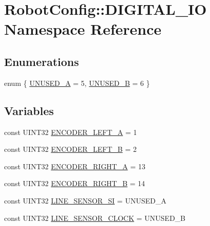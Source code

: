 \hypertarget{namespace_robot_config_1_1_d_i_g_i_t_a_l___i_o}{
\section{\-Robot\-Config\-:\-:\-D\-I\-G\-I\-T\-A\-L\-\_\-\-I\-O \-Namespace \-Reference}
\label{namespace_robot_config_1_1_d_i_g_i_t_a_l___i_o}
}
\subsection*{\-Enumerations}
\begin{DoxyCompactItemize}
\item 
enum \{ \hyperlink{namespace_robot_config_1_1_d_i_g_i_t_a_l___i_o_a8b8a1ff8bec1c8045cba1a03dfa5eca2a066884c8c940fd49bb5b067e65a282fb}{\-U\-N\-U\-S\-E\-D\-\_\-\-A} =  5, 
\hyperlink{namespace_robot_config_1_1_d_i_g_i_t_a_l___i_o_a8b8a1ff8bec1c8045cba1a03dfa5eca2ada8313080195b88178515eb12a62b789}{\-U\-N\-U\-S\-E\-D\-\_\-\-B} =  6
 \}
\end{DoxyCompactItemize}
\subsection*{\-Variables}
\begin{DoxyCompactItemize}
\item 
const \-U\-I\-N\-T32 \hyperlink{namespace_robot_config_1_1_d_i_g_i_t_a_l___i_o_a47224f03604ec5254954ee2da426eb73}{\-E\-N\-C\-O\-D\-E\-R\-\_\-\-L\-E\-F\-T\-\_\-\-A} = 1
\item 
const \-U\-I\-N\-T32 \hyperlink{namespace_robot_config_1_1_d_i_g_i_t_a_l___i_o_a50ba694d1d0480700e31fd9acc9e0b3e}{\-E\-N\-C\-O\-D\-E\-R\-\_\-\-L\-E\-F\-T\-\_\-\-B} = 2
\item 
const \-U\-I\-N\-T32 \hyperlink{namespace_robot_config_1_1_d_i_g_i_t_a_l___i_o_a18e5f80cfd014527dc4cfa06f99fa575}{\-E\-N\-C\-O\-D\-E\-R\-\_\-\-R\-I\-G\-H\-T\-\_\-\-A} = 13
\item 
const \-U\-I\-N\-T32 \hyperlink{namespace_robot_config_1_1_d_i_g_i_t_a_l___i_o_a5a238f3f7496d5c1e2e62a0f8f8e57e6}{\-E\-N\-C\-O\-D\-E\-R\-\_\-\-R\-I\-G\-H\-T\-\_\-\-B} = 14
\item 
const \-U\-I\-N\-T32 \hyperlink{namespace_robot_config_1_1_d_i_g_i_t_a_l___i_o_ab2c5bbe5380cf4e1d0715e8d753be094}{\-L\-I\-N\-E\-\_\-\-S\-E\-N\-S\-O\-R\-\_\-\-S\-I} = \-U\-N\-U\-S\-E\-D\-\_\-\-A
\item 
const \-U\-I\-N\-T32 \hyperlink{namespace_robot_config_1_1_d_i_g_i_t_a_l___i_o_acd451eb961fe9a095191c909e81f5f1c}{\-L\-I\-N\-E\-\_\-\-S\-E\-N\-S\-O\-R\-\_\-\-C\-L\-O\-C\-K} = \-U\-N\-U\-S\-E\-D\-\_\-\-B
\end{DoxyCompactItemize}


